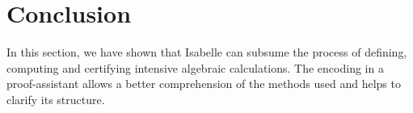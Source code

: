 \documentclass[runningheads]{llncs}
\begin{document}
\section{Conclusion}

In this section, we have shown that Isabelle can subsume the process
of defining, computing and certifying intensive algebraic
calculations. The encoding in a proof-assistant allows a better
comprehension of the methods used and helps to clarify its structure.
%
%
%
% 
% 
\printbibliography
%
\end{document}
